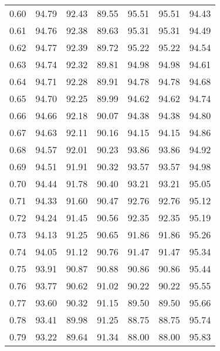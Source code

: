\begin{tabular}{|c|c|c|c|c|c|c|}
      0.60 &     94.79 &     92.43 &      89.55 &   95.51 &      95.51 &         94.43 \\
      0.61 &     94.76 &     92.38 &      89.63 &   95.31 &      95.31 &         94.49 \\
      0.62 &     94.77 &     92.39 &      89.72 &   95.22 &      95.22 &         94.54 \\
      0.63 &     94.74 &     92.32 &      89.81 &   94.98 &      94.98 &         94.61 \\
      0.64 &     94.71 &     92.28 &      89.91 &   94.78 &      94.78 &         94.68 \\
      0.65 &     94.70 &     92.25 &      89.99 &   94.62 &      94.62 &         94.74 \\
      0.66 &     94.66 &     92.18 &      90.07 &   94.38 &      94.38 &         94.80 \\
      0.67 &     94.63 &     92.11 &      90.16 &   94.15 &      94.15 &         94.86 \\
      0.68 &     94.57 &     92.01 &      90.23 &   93.86 &      93.86 &         94.92 \\
      0.69 &     94.51 &     91.91 &      90.32 &   93.57 &      93.57 &         94.98 \\
      0.70 &     94.44 &     91.78 &      90.40 &   93.21 &      93.21 &         95.05 \\
      0.71 &     94.33 &     91.60 &      90.47 &   92.76 &      92.76 &         95.12 \\
      0.72 &     94.24 &     91.45 &      90.56 &   92.35 &      92.35 &         95.19 \\
      0.73 &     94.13 &     91.25 &      90.65 &   91.86 &      91.86 &         95.26 \\
      0.74 &     94.05 &     91.12 &      90.76 &   91.47 &      91.47 &         95.34 \\
      0.75 &     93.91 &     90.87 &      90.88 &   90.86 &      90.86 &         95.44 \\
      0.76 &     93.77 &     90.62 &      91.02 &   90.22 &      90.22 &         95.55 \\
      0.77 &     93.60 &     90.32 &      91.15 &   89.50 &      89.50 &         95.66 \\
      0.78 &     93.41 &     89.98 &      91.25 &   88.75 &      88.75 &         95.74 \\
      0.79 &     93.22 &     89.64 &      91.34 &   88.00 &      88.00 &         95.83 \\

\end{tabular}
